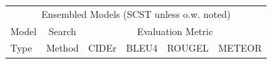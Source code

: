 \documentclass[10pt,twocolumn,letterpaper]{article}
\begin{document}
\begin{table}[t]
\begin{tabular}{l|c|cccc}

\hline \hline
\multicolumn{6}{c}{\multirow{2}{*}{Ensembled Models (SCST unless o.w. noted)}} \\
\multicolumn{6}{c}{}\\
\hline
Model &  Search & \multicolumn{4}{c}{Evaluation Metric} \\
 Type & Method & CIDEr & BLEU4 & ROUGEL & METEOR  \\


\end{tabular}
\end{table}
\end{document}
